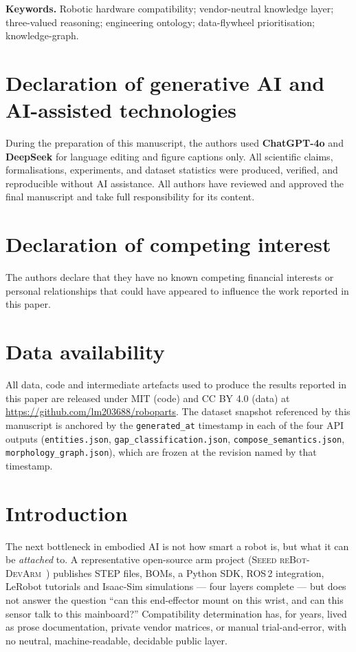 \documentclass[review]{elsarticle}
\begin{document}
\begin{frontmatter}
\noindent\textbf{Keywords.}
Robotic hardware compatibility; vendor-neutral knowledge layer;
three-valued reasoning; engineering ontology;
data-flywheel prioritisation; knowledge-graph.

\end{frontmatter}

\section*{Declaration of generative AI and AI-assisted technologies}
\small
During the preparation of this manuscript, the authors used
\textbf{ChatGPT-4o} and \textbf{DeepSeek} for language editing and
figure captions only. All scientific claims, formalisations,
experiments, and dataset statistics were produced, verified, and
reproducible without AI assistance. All authors have reviewed and
approved the final manuscript and take full responsibility for
its content.

\section*{Declaration of competing interest}
The authors declare that they have no known competing financial
interests or personal relationships that could have appeared to
influence the work reported in this paper.

\section*{Data availability}
All data, code and intermediate artefacts used to produce the results
reported in this paper are released under MIT (code) and CC BY 4.0
(data) at \url{https://github.com/lm203688/roboparts}. The dataset
snapshot referenced by this manuscript is anchored by the
\texttt{generated\_at} timestamp in each of the four API outputs
(\texttt{entities.json}, \texttt{gap\_classification.json},
\texttt{compose\_semantics.json}, \texttt{morphology\_graph.json}),
which are frozen at the revision named by that timestamp.

\section{Introduction}

The next bottleneck in embodied AI is not how smart a robot is, but
what it can be \emph{attached} to. A representative open-source arm
project (\textsc{Seeed reBot-DevArm}~\cite{R14}) publishes STEP files,
BOMs, a Python SDK, ROS\,2 integration, LeRobot tutorials and Isaac-Sim
simulations — four layers complete — but does not answer the question
``can this end-effector mount on this wrist, and can this sensor talk
to this mainboard?'' Compatibility determination has, for years,
lived as prose documentation, private vendor matrices, or manual
trial-and-error, with no neutral, machine-readable, decidable public
layer.
\end{document}
